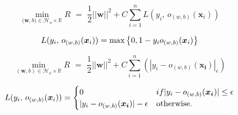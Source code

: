 \documentclass{article}
\newcommand{\set}[1]{{\left\{#1\right\}}}
\newcommand{\reals}{{\mathbb R}}
\begin{document}
\newpage

\begin{equation}
\label{eqn:reghingeloss}
\min\limits_{\bm (\bm{w},b) \in \mathcal{H}_o \times \reals} R {\,\,} = {\,\,} \frac{1}{2}||\bm{w}||^2 + C\sum_{i=1}^n L(y_i,\, o_{(w,b)}(\bm{x}_i))
\end{equation}

\begin{equation}\label{eqn:hingeloss}
\centering
L(y_i,\, o_{(w,b)}(\bm{x}_i)) = \max \set{0, 1 - y_i o_{(w,b)}(\bm{x}_i)}
\end{equation}

\begin{equation}
\label{eq:regsvmemp}
\min\limits_{(\bm{w},b) \in \mathcal{H}_o \times \reals} R {\,\,} = {\,\,} \frac{1}{2}||\bm{w}||^2 + C\sum_{i=1}^n (|y_i - o_{(w,b)}(\bm{x_i})|_\epsilon)
\end{equation}

\begin{equation}
\label{eq:epsloss}
\centering
L(y_i,\, o_{(w,b)}(\bm{x}_i)) = \begin{cases} 
															0 & if |y_i - o_{(w,b)}(\bm{x_i})| \leq \epsilon \\
															|y_i - o_{(w,b)}(\bm{x_i})| - \epsilon & \text{otherwise}.
														\end{cases}
\end{equation}

\newpage
\end{document}
